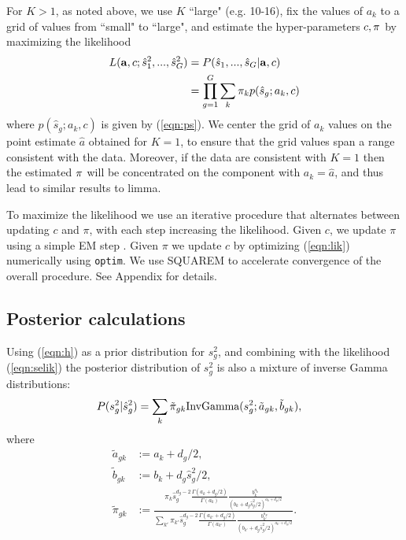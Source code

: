 \documentclass{bioinfo}
\begin{document}
\begin{methods}
For $K>1$, as noted above, we use $K$ ``large" (e.g. 10-16), fix the values of $a_k$ to a grid of values from ``small" to ``large", and estimate the hyper-parameters $c,\mathbf \pi$ by maximizing the likelihood
\begin{align}
L(\mathbf a, c; \hat{s}_1^2,..., \hat{s}_G^2) &=P(\hat{s}_1,...,\hat{s}_G| \mathbf a, c) \\ 
&=\prod\limits_{g=1}^G \sum_k \pi_k p(\hat{s}_g; a_k,c) \label{eqn:lik}
\end{align}
where $p(\hat{s}_g; a_k,c)$ is given by (\ref{eqn:ps}).
 We center the grid of $a_k$ values on the point estimate $\hat{a}$ obtained for $K=1$, to ensure that the grid values span a range consistent with the data. Moreover, if the data are consistent with $K=1$ then the estimated $\mathbf \pi$ will be concentrated on the component with $a_k=\hat{a}$, and thus lead to similar results to limma.
 
To maximize the likelihood we use an iterative procedure that alternates between updating $c$ and $\pi$, with each step increasing the likelihood. 
Given $c$, we update $\pi$ using a simple EM step \citep{dempster1977em}. Given $\pi$ we update $c$ by optimizing (\ref{eqn:lik}) numerically using {\tt optim}. We use SQUAREM \citep{varadhan2010squarem} to accelerate
convergence of the overall procedure. See Appendix for details.

\subsection{Posterior calculations}
Using (\ref{eqn:h}) as a prior distribution for $s_g^2$, and combining with the likelihood (\ref{eqn:selik}) the posterior distribution of $s_g^2$ is also a mixture of inverse Gamma distributions:
\begin{align}
P(s_g^2|\hat{s}_g^2) %
& =\sum_k \tilde{\pi}_{gk} \IG(s_g^2; \tilde{a}_{gk}, \tilde{b}_{gk}),
\end{align}
where
\begin{align}
\tilde{a}_{gk}&:=a_k+d_g/2 , \label{post}  \\
\tilde{b}_{gk}&:=b_k+d_g \hat{s}_g^2/2, \\
\tilde{\pi}_{gk}& := \frac{\pi_k \hat{s}_g^{d_g-2}\frac{\Gamma(a_k+d_g/2)}{\Gamma(a_k)}\frac{b_k^{a_k}}{(b_k+d_g\hat{s}_g^2/2)^{a_k+d_g/2}}}
{\sum_{k'} \pi_{k'} \hat{s}_g^{d_g-2}\frac{\Gamma(a_{k'}+d_g/2)}{\Gamma(a_{k'})}\frac{b_{k'}^{a_{k'}}}{(b_{k'}+d_g\hat{s}_g^2/2)^{a_{k'}+d_g/2}}}.   \label{eqn:postpi}
\end{align}


\end{methods}
\end{document}
